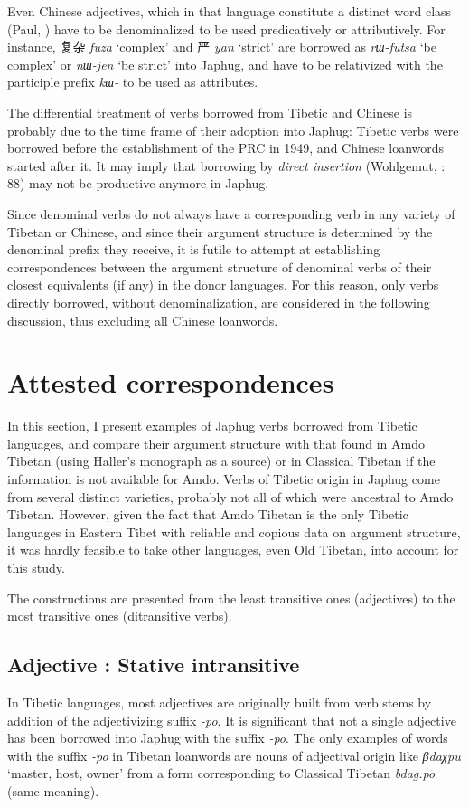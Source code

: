 \documentclass[oneside,a4paper,11pt]{article}
\newcommand{\ipa}[1]{{\phon\textit{\mbox{#1}}}} %
\newcommand{\zh}[1]{{\cn #1}}
\begin{document}
Even Chinese adjectives, which in that language constitute a distinct word class (Paul, \citeyear{paul10adj}) have to be denominalized to be used predicatively or attributively. For instance, \zh{复杂} \ipa{fuza} `complex' and \zh{严} \ipa{yan} `strict' are borrowed as \ipa{rɯ-futsa} `be complex' or \ipa{nɯ-jen} `be strict' into Japhug, and have to be relativized with the participle prefix \ipa{kɯ-} to be used as attributes.

The differential treatment of verbs borrowed from Tibetic and Chinese is probably due to the time frame of their adoption into Japhug: Tibetic verbs were borrowed before the establishment of the PRC in 1949, and Chinese loanwords started after it. It may imply that borrowing by \textit{direct insertion} (Wohlgemut, \citeyear{wohlgemuth09verbal}: 88) may not be productive anymore in Japhug.

Since denominal verbs do not always have a corresponding verb in any variety of Tibetan or Chinese, and since their argument structure is determined by the denominal prefix they receive, it is futile to attempt at establishing correspondences between the argument structure of denominal verbs of their closest equivalents (if any) in the donor languages. For this reason, only verbs directly borrowed, without denominalization, are considered in the following discussion, thus excluding all Chinese loanwords.
 
  \section{Attested correspondences} 
 In this section, I present examples of Japhug verbs borrowed from Tibetic languages, and compare their argument structure with that found in Amdo Tibetan (using Haller's \citeyear{haller04themchen} monograph as a source) or in Classical Tibetan if the information is not available for Amdo. Verbs of Tibetic origin in Japhug come from several distinct varieties, probably not all of which were ancestral to Amdo Tibetan. However, given the fact that Amdo Tibetan is the only Tibetic languages in Eastern Tibet with reliable and copious data on argument structure, it was hardly feasible to take other languages, even Old Tibetan, into account for this study.
 
 The constructions are presented from the least transitive ones (adjectives) to the most transitive ones (ditransitive verbs). 
   
  \subsection{Adjective : Stative intransitive}  
In Tibetic languages, most adjectives are originally built from verb stems by addition of the adjectivizing suffix \ipa{-po}. It is significant that not a single adjective has been borrowed into Japhug with the suffix \ipa{-po}. The only examples of words with the suffix \ipa{-po} in Tibetan loanwords are nouns of adjectival origin like \ipa{βdaχpu} `master, host, owner' from a form corresponding to Classical Tibetan \ipa{bdag.po} (same meaning).
\end{document}
